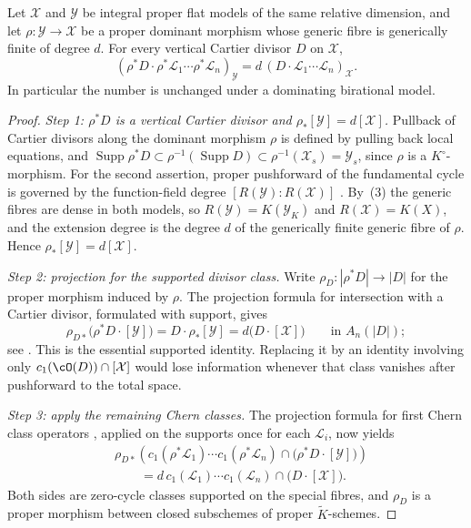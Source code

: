 \begin{theorem}\label{thm:model-projection-formula}
Let $\mathcal X$ and $\mathcal Y$ be integral proper flat models of the same
relative dimension, and let
$\rho:\mathcal Y\to\mathcal X$ be a proper dominant morphism whose generic
fibre is generically finite of degree $d$. For every vertical Cartier divisor
$D$ on $\mathcal X$,
\[
 (\rho^*D\cdot\rho^*\mathcal L_1\cdots\rho^*\mathcal L_n)_{\mathcal Y}
       =d\,(D\cdot\mathcal L_1\cdots\mathcal L_n)_{\mathcal X}.
\]
In particular the number is unchanged under a dominating birational model.
\end{theorem}
\begin{proof}
\emph{Step 1: $\rho^*D$ is a vertical Cartier divisor and
$\rho_*[\mathcal Y]=d[\mathcal X]$.}
Pullback of Cartier divisors along the dominant morphism $\rho$ is defined
by pulling back local equations, and
$\operatorname{Supp}\rho^*D\subset\rho^{-1}(\operatorname{Supp}D)
\subset\rho^{-1}(\mathcal X_s)=\mathcal Y_s$,
since $\rho$ is a $K^\circ$-morphism.  For the second assertion, proper
pushforward of the fundamental cycle is governed by the function-field
degree $[R(\mathcal Y):R(\mathcal X)]$ \cite[\S1.4]{Ful}.  By
\,(3) the generic fibres are dense in both
models, so $R(\mathcal Y)=K(\mathcal Y_K)$ and
$R(\mathcal X)=K(X)$, and the extension degree is the degree $d$ of the
generically finite generic fibre of $\rho$.  Hence
$\rho_*[\mathcal Y]=d[\mathcal X]$.

\emph{Step 2: projection for the supported divisor class.}  Write
$\rho_D:|\rho^*D|\to|D|$ for the proper morphism induced by $\rho$.
The projection formula for intersection with a Cartier divisor, formulated
with support, gives
\[
 \rho_{D*}\bigl(\rho^*D\mathbin{\cdot}[\mathcal Y]\bigr)
   =D\mathbin{\cdot}\rho_*[\mathcal Y]
   =d\bigl(D\mathbin{\cdot}[\mathcal X]\bigr)
       \qquad\text{in }A_n(|D|);
\]
see \cite[Proposition~2.3(c)]{Ful}.  This is the essential supported
identity.  Replacing it by an identity involving only
$c_1(\cO(D))\cap[\mathcal X]$ would lose information whenever that class
vanishes after pushforward to the total space.

\emph{Step 3: apply the remaining Chern classes.}  The projection formula
for first Chern class operators \cite[Proposition~2.5(c)]{Ful}, applied on
the supports once for each $\mathcal L_i$, now yields
\[
 \begin{aligned}
 &\rho_{D*}\!\left(
 c_1(\rho^*\mathcal L_1)\cdots c_1(\rho^*\mathcal L_n)
 \cap\bigl(\rho^*D\mathbin{\cdot}[\mathcal Y]\bigr)\right)\\
 &\qquad=d\,c_1(\mathcal L_1)\cdots c_1(\mathcal L_n)
 \cap\bigl(D\mathbin{\cdot}[\mathcal X]\bigr).
 \end{aligned}
\]
Both sides are zero-cycle classes supported on the special fibres, and
$\rho_D$ is a proper morphism between closed subschemes of proper
$\widetilde K$-schemes.


\end{proof}
